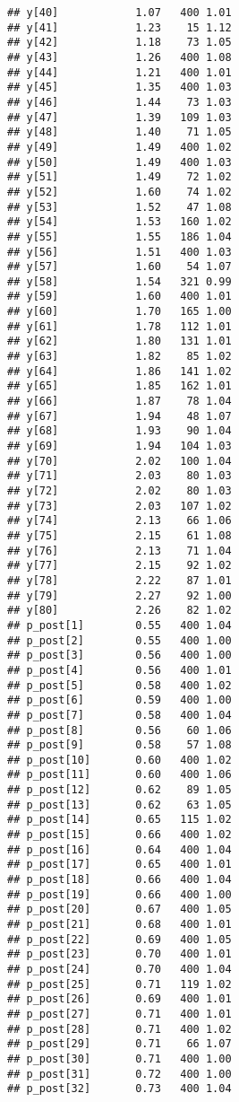 \documentclass{article}\usepackage[]{graphicx}\usepackage[]{color}
\makeatletter
\newenvironment{kframe}{%
 \def\at@end@of@kframe{}%
 \ifinner\ifhmode%
  \def\at@end@of@kframe{\end{minipage}}%
  \begin{minipage}{\columnwidth}%
 \fi\fi%
 \def\FrameCommand##1{\hskip\@totalleftmargin \hskip-\fboxsep
 \colorbox{shadecolor}{##1}\hskip-\fboxsep
     \hskip-\linewidth \hskip-\@totalleftmargin \hskip\columnwidth}%
 \MakeFramed {\advance\hsize-\width
   \@totalleftmargin\z@ \linewidth\hsize
   \@setminipage}}%
 {\par\unskip\endMakeFramed%
 \at@end@of@kframe}
\newenvironment{knitrout}{}{} %
\makeatother
\begin{document}
\begin{knitrout}
\begin{kframe}
\begin{verbatim}
## y[40]            1.07   400 1.01
## y[41]            1.23    15 1.12
## y[42]            1.18    73 1.05
## y[43]            1.26   400 1.08
## y[44]            1.21   400 1.01
## y[45]            1.35   400 1.03
## y[46]            1.44    73 1.03
## y[47]            1.39   109 1.03
## y[48]            1.40    71 1.05
## y[49]            1.49   400 1.02
## y[50]            1.49   400 1.03
## y[51]            1.49    72 1.02
## y[52]            1.60    74 1.02
## y[53]            1.52    47 1.08
## y[54]            1.53   160 1.02
## y[55]            1.55   186 1.04
## y[56]            1.51   400 1.03
## y[57]            1.60    54 1.07
## y[58]            1.54   321 0.99
## y[59]            1.60   400 1.01
## y[60]            1.70   165 1.00
## y[61]            1.78   112 1.01
## y[62]            1.80   131 1.01
## y[63]            1.82    85 1.02
## y[64]            1.86   141 1.02
## y[65]            1.85   162 1.01
## y[66]            1.87    78 1.04
## y[67]            1.94    48 1.07
## y[68]            1.93    90 1.04
## y[69]            1.94   104 1.03
## y[70]            2.02   100 1.04
## y[71]            2.03    80 1.03
## y[72]            2.02    80 1.03
## y[73]            2.03   107 1.02
## y[74]            2.13    66 1.06
## y[75]            2.15    61 1.08
## y[76]            2.13    71 1.04
## y[77]            2.15    92 1.02
## y[78]            2.22    87 1.01
## y[79]            2.27    92 1.00
## y[80]            2.26    82 1.02
## p_post[1]        0.55   400 1.04
## p_post[2]        0.55   400 1.00
## p_post[3]        0.56   400 1.00
## p_post[4]        0.56   400 1.01
## p_post[5]        0.58   400 1.02
## p_post[6]        0.59   400 1.00
## p_post[7]        0.58   400 1.04
## p_post[8]        0.56    60 1.06
## p_post[9]        0.58    57 1.08
## p_post[10]       0.60   400 1.02
## p_post[11]       0.60   400 1.06
## p_post[12]       0.62    89 1.05
## p_post[13]       0.62    63 1.05
## p_post[14]       0.65   115 1.02
## p_post[15]       0.66   400 1.02
## p_post[16]       0.64   400 1.04
## p_post[17]       0.65   400 1.01
## p_post[18]       0.66   400 1.04
## p_post[19]       0.66   400 1.00
## p_post[20]       0.67   400 1.05
## p_post[21]       0.68   400 1.01
## p_post[22]       0.69   400 1.05
## p_post[23]       0.70   400 1.01
## p_post[24]       0.70   400 1.04
## p_post[25]       0.71   119 1.02
## p_post[26]       0.69   400 1.01
## p_post[27]       0.71   400 1.01
## p_post[28]       0.71   400 1.02
## p_post[29]       0.71    66 1.07
## p_post[30]       0.71   400 1.00
## p_post[31]       0.72   400 1.00
## p_post[32]       0.73   400 1.04

\end{verbatim}
\end{kframe}
\end{knitrout}
\end{document}
